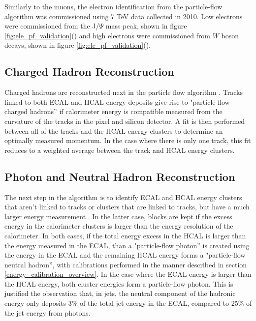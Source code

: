 \par Similarly to the muons, the electron identification from the
particle-flow algorithm was commissioned using 7 TeV data collected in
2010.  Low \PT electrons were commissioned from the J/$\Psi$ mass
peak, shown in figure
\ref{fig:ele_pf_validation}() and high \PT
electrons were commissioned from $W$ boson decays, shown in figure
\ref{fig:ele_pf_validation}(). 

\subsection{Charged Hadron Reconstruction}
\label{charged_hadron_reco_overview}

\par Charged hadrons are reconstructed next in the particle flow
algorithm \cite{CMS-PAS-PFT-09-001}.  Tracks linked to both ECAL and
HCAL energy deposits give rise to "particle-flow charged hadrons'' if
calorimeter energy is compatible measured from the curvature of the
tracks in the pixel and silicon detector.  A fit is then performed
between all of the tracks and the HCAL energy clusters to determine an
optimally measured momentum.  In the case where there is only one
track, this fit reduces to a weighted average between the track and
HCAL energy clusters.  

\subsection{Photon and Neutral Hadron Reconstruction}
\label{neutral_hadron_reco_overview}

\par The next step in the algorithm is to identify ECAL and HCAL
energy clusters that aren't linked to tracks or clusters that are
linked to tracks, but have a much larger energy measurement
.  In the latter case, blocks are kept if the
excess energy in the calorimeter clusters is larger than the energy
resolution of the calorimeter.  In both cases, if the total energy
excess in the HCAL is larger than the energy measured in the ECAL,
than a "particle-flow photon'' is created using the energy in the ECAL
and the remaining HCAL energy forms a "particle-flow neutral hadron'',
with calibrations performed in the manner described in
section \ref{energy_calibration_overview}.  In the case where the ECAL
energy  is larger than the HCAL energy, both cluster energies form a
particle-flow photon.  This is justified the observation that, in jets,
the neutral component of the hadronic energy only deposits 3$\%$ of
the total jet energy in the ECAL, compared to 25$\%$ of the jet energy
from photons.   


